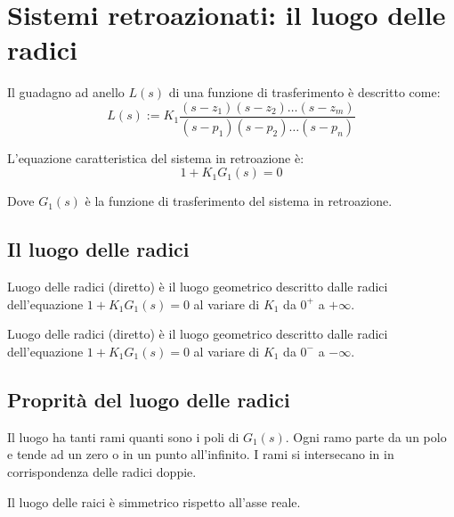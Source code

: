 \section{Sistemi retroazionati: il luogo delle radici}


Il guadagno ad anello $L(s)$ di una funzione di trasferimento è descritto come:
\begin{equation}
  L(s) := K_1 \frac{
    (s-z_1)(s-z_2)\dots(s-z_m)
  }{
    (s-p_1)(s-p_2)\dots(s-p_n)
  }
\end{equation}

L'equazione caratteristica del sistema in retroazione è:
\begin{equation}
  1 + K_1 G_1(s) = 0
\end{equation}

Dove $G_1(s)$ è la funzione di trasferimento del sistema in retroazione.

\subsection{Il luogo delle radici}
\begin{definition}
  Luogo delle radici (diretto) è il luogo geometrico descritto dalle radici 
  dell'equazione  $1 + K_1 G_1(s) = 0$ al variare di $K_1$ da $0^+$ a $+\infty$.
\end{definition}


\begin{definition}
  Luogo delle radici (diretto) è il luogo geometrico descritto dalle radici 
  dell'equazione  $1 + K_1 G_1(s) = 0$ al variare di $K_1$ da $0^-$ a $-\infty$.
\end{definition}

\subsection{Proprità del luogo delle radici}
\begin{definition}[Proprietà 1]
  Il luogo ha tanti rami quanti sono i poli di $G_1(s)$.
  Ogni ramo parte da un polo e tende ad un zero o in un punto all'infinito.
  I rami si intersecano in in corrispondenza delle radici doppie.
\end{definition}

\begin{definition}[Proprietà 2]
  Il luogo delle raici è simmetrico rispetto all'asse reale.
\end{definition}


